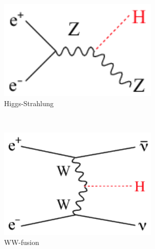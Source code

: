     \begin{figure}  
        \centering
        \begin{subfigure}[t]{0.3\textwidth}
            \includegraphics[width = 0.85\textwidth]{Pictures/Higgs/Chapter_Theory_figs_ZHdiagram.png}
            \caption{Higgs-Strahlung}
            \label{fig:higgsStrahlung}
        \end{subfigure}
        ~%
        \begin{subfigure}[t]{0.3\textwidth}
            \includegraphics[width = 0.85\textwidth]{Pictures/Higgs/Chapter_Theory_figs_nunuHdiagram.png}
            \caption{WW-fusion}
            \label{fig:WW-fusion}
        \end{subfigure}
        ~%
        \begin{subfigure}[t]{0.3\textwidth}

\end{subfigure}
\end{figure}
